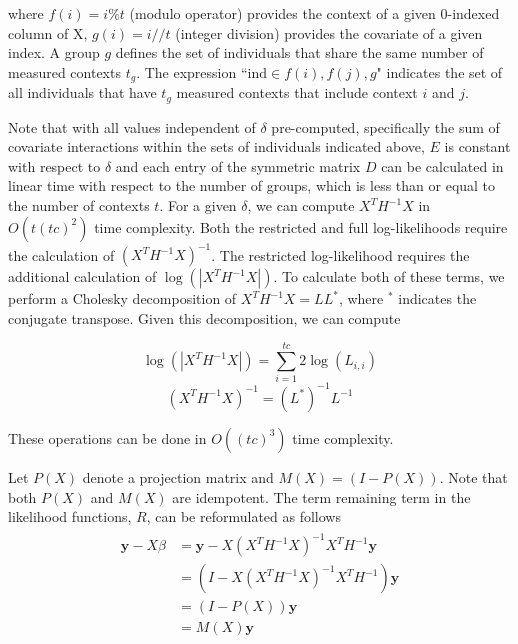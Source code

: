         \noindent where $f(i) = i \% t$ (modulo operator) provides the context of a given 0-indexed column of X, $g(i) = i // t$ (integer division) provides the covariate of a given index. A group $g$ defines the set of individuals that share the same number of measured contexts $t_g$. The expression ``$\text{ind} \in f(i),f(j),g$" indicates the set of all individuals that have $t_g$ measured contexts that include context $i$ and $j$. 
        
        Note that with all values independent of $\delta$ pre-computed, specifically the sum of covariate interactions within the sets of individuals indicated above, $E$ is constant with respect to $\delta$ and each entry of the symmetric matrix $D$ can be calculated in linear time with respect to the number of groups, which is less than or equal to the number of contexts $t$. For a given $\delta$, we can compute $X^TH^{-1}X$ in $O(t(tc)^2)$ time complexity. Both the restricted and full log-likelihoods require the calculation of $(X^TH^{-1}X)^{-1}$. The restricted log-likelihood requires the additional calculation of $\log{(|X^TH^{-1}X|)}$. To calculate both of these terms, we perform a Cholesky decomposition of $X^TH^{-1}X = LL^*$, where $^*$ indicates the conjugate transpose. Given this decomposition, we can compute 
        
        \begin{equation}
            \log{(|X^TH^{-1}X|)} = \sum_{i=1}^{tc} 2\log(L_{i,i})
        \end{equation}
        \begin{equation}
            (X^TH^{-1}X)^{-1} = (L^*)^{-1}L^{-1}
        \end{equation}
        
        \noindent These operations can be done in $O((tc)^3)$ time complexity. 
        
        Let $P(X)$ denote a projection matrix and $M(X) = (I-P(X))$. Note that both $P(X)$ and $M(X)$ are idempotent. The term remaining term in the likelihood functions, $R$, can be reformulated as follows
        \begin{align}
        \begin{split}
            \mathbf{y}- X\hat{\beta} & = \mathbf{y} - X(X^TH^{-1}X)^{-1}X^TH^{-1}\mathbf{y} \\
                                     & = (I - X(X^TH^{-1}X)^{-1}X^TH^{-1})\mathbf{y} \\
                                     & = (I - P(X))\mathbf{y} \\
                                     & = M(X)\mathbf{y}
        \end{split}
        \end{align}
        
